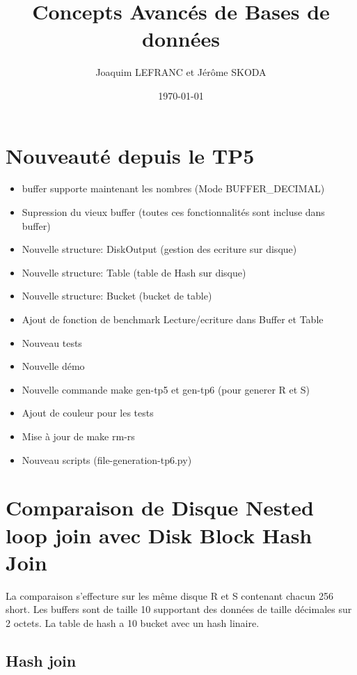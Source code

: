 \documentclass[a4paper]{article}
\title{Concepts Avancés de Bases de données}
\author{Joaquim LEFRANC et Jérôme SKODA}
\date{\today}
\begin{document}
\maketitle


\section{Nouveauté depuis le TP5}

\begin{itemize}
  \item buffer supporte maintenant les nombres (Mode BUFFER\_DECIMAL)
  \item Supression du vieux buffer (toutes ces fonctionnalités sont incluse dans buffer)
  \item Nouvelle structure: DiskOutput (gestion des ecriture sur disque)
  \item Nouvelle structure: Table  (table de Hash sur disque)
  \item Nouvelle structure: Bucket (bucket de table)
  \item Ajout de fonction de benchmark Lecture/ecriture dans Buffer et Table
  \item Nouveau tests
  \item Nouvelle démo
  \item Nouvelle commande make gen-tp5 et gen-tp6 (pour generer R et S)
  \item Ajout de couleur pour les tests
  \item Mise à jour de make rm-rs
  \item Nouveau scripts (file-generation-tp6.py)
\end{itemize}

\section{Comparaison de Disque Nested loop join avec Disk Block Hash Join}

La comparaison s'effecture sur les même disque R et S contenant chacun 256
short. Les buffers sont de taille 10 supportant des données de taille
décimales sur 2 octets. La table de hash a 10 bucket avec un hash linaire.

\subsection{Hash join}
\end{document}
